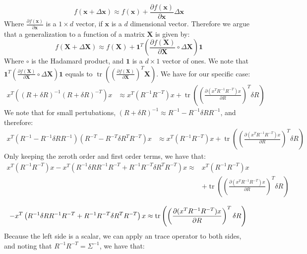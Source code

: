 \documentclass[10pt]{article}
\DeclareMathOperator{\Tr}{tr}
\begin{document}
\begin{equation}
    f(\mathbf{x}+\Delta \mathbf{x}) \approx f(\mathbf{x}) + \frac{\partial f(\mathbf{x})}{\partial \mathbf{x}}\Delta \mathbf{x}
\end{equation}
Where $\frac{\partial f(\mathbf{x})}{\partial \mathbf{x}}$ is a $1\times d$ vector, if $\mathbf{x}$ is a $d$ dimensional vector. Therefore 
we argue that a generalization to a function of a matrix $\mathbf{X}$ is given by:
\begin{equation}
    f(\mathbf{X}+\Delta \mathbf{X}) \approx f(\mathbf{X}) + \mathbf{1}^T\left(\frac{\partial f(\mathbf{X})}{\partial \mathbf{X}}\circ \Delta \mathbf{X}\right)\mathbf{1}
\end{equation}
Where $\circ$ is the Hadamard product, and $\mathbf{1}$ is a $d\times 1$ vector of ones. We note that $\mathbf{1}^T\left(\frac{\partial f(\mathbf{X})}{\partial \mathbf{X}}\circ \Delta \mathbf{X}\right)\mathbf{1}$
equals to $\Tr\left(\left(\frac{\partial f(\mathbf{X})}{\partial \mathbf{X}}\right)^T\mathbf{X}\right)$. We have for our specific case:
\begin{align*}
    x^T((R+\delta R)^{-1}(R+\delta R)^{-T})x &\approx x^T(R^{-1}R^{-T})x + \Tr\left(\left(\frac{\partial(x^TR^{-1}R^{-T})x}{\partial R}\right)^T  \delta R\right)
\end{align*}
We note that for small pertubations, $(R+\delta R)^{-1} \approx R^{-1} - R^{-1}\delta R R^{-1}$, and therefore:
\begin{align*}
    x^T (R^{-1} - R^{-1}\delta R R^{-1})(R^{-T} - R^{-T}\delta R^T R^{-T})x &\approx x^T(R^{-1}R^{-T})x + \Tr\left(\left(\frac{\partial(x^TR^{-1}R^{-T})x}{\partial R}\right)^T  \delta R\right)
\end{align*}
Only keeping the zeroth order and first order terms, we have that:
\begin{align*}
    x^T(R^{-1}R^{-T})x - x^T \left(R^{-1}\delta R R^{-1}R^{-T} + R^{-1}R^{-T}\delta R^T R^{-T}\right)x \approx& x^T(R^{-1}R^{-T})x \\&+ \Tr\left(\left(\frac{\partial(x^TR^{-1}R^{-T})x}{\partial R}\right)^T  \delta R\right)\\
\end{align*}
\begin{equation}
    - x^T \left(R^{-1}\delta R R^{-1}R^{-T} + R^{-1}R^{-T}\delta R^T R^{-T}\right)x \approx \Tr\left(\left(\frac{\partial(x^TR^{-1}R^{-T})x}{\partial R}\right)^T  \delta R\right)\\
\end{equation}
Because the left side is a scalar, we can apply an trace operator to both sides, and noting that $R^{-1}R^{-T}=\Sigma^{-1}$, we have that:
\end{document}
